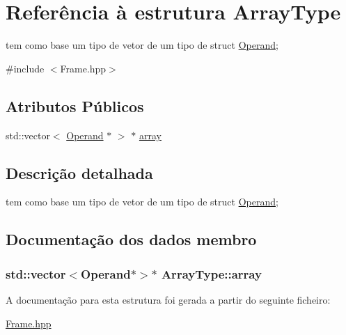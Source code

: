 \hypertarget{struct_array_type}{}\section{Referência à estrutura Array\+Type}
\label{struct_array_type}


tem como base um tipo de vetor de um tipo de struct \hyperlink{struct_operand}{Operand};  




{\ttfamily \#include $<$Frame.\+hpp$>$}

\subsection*{Atributos Públicos}
\begin{DoxyCompactItemize}
\item 
std\+::vector$<$ \hyperlink{struct_operand}{Operand} $\ast$ $>$ $\ast$ \hyperlink{struct_array_type_a26ce491115f4a9ecad8e6315b9ffd447}{array}
\end{DoxyCompactItemize}


\subsection{Descrição detalhada}
tem como base um tipo de vetor de um tipo de struct \hyperlink{struct_operand}{Operand}; 

\subsection{Documentação dos dados membro}
\subsubsection[{\texorpdfstring{array}{array}}]{\setlength{\rightskip}{0pt plus 5cm}std\+::vector$<${\bf Operand}$\ast$$>$$\ast$ Array\+Type\+::array}\hypertarget{struct_array_type_a26ce491115f4a9ecad8e6315b9ffd447}{}\label{struct_array_type_a26ce491115f4a9ecad8e6315b9ffd447}


A documentação para esta estrutura foi gerada a partir do seguinte ficheiro\+:\begin{DoxyCompactItemize}
\item 
\hyperlink{_frame_8hpp}{Frame.\+hpp}\end{DoxyCompactItemize}
